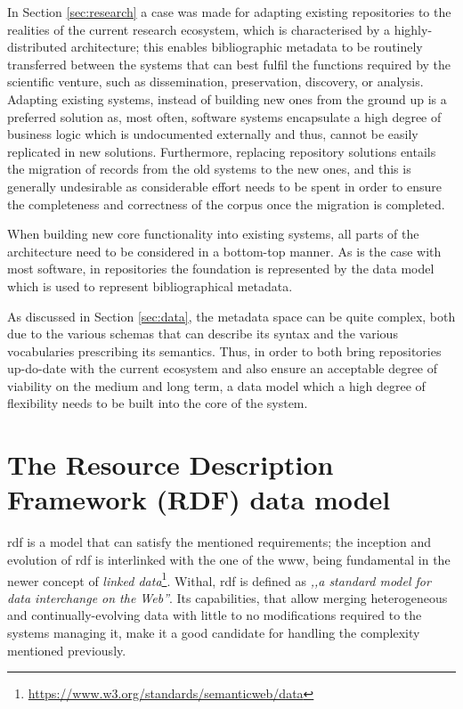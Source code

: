 In Section \ref{sec:research} a case was made for adapting existing repositories to the realities of the current research ecosystem, which is characterised by a highly-distributed architecture; this enables bibliographic metadata to be routinely transferred between the systems that can best fulfil the functions required by the scientific venture, such as dissemination, preservation, discovery, or analysis. Adapting existing systems, instead of building new ones from the ground up is a preferred solution as, most often, software systems encapsulate a high degree of business logic which is undocumented externally and thus, cannot be easily replicated in new solutions. Furthermore, replacing repository solutions entails the migration of records from the old systems to the new ones, and this is generally undesirable as considerable effort needs to be spent in order to ensure the completeness and correctness of the corpus once the migration is completed.

When building new core functionality into existing systems, all parts of the architecture need to be considered in a bottom-top manner. As is the case with most software, in repositories the foundation is represented by the data model which is used to represent bibliographical metadata.

As discussed in Section \ref{sec:data}, the metadata space can be quite complex, both due to the various schemas that can describe its syntax and the various vocabularies prescribing its semantics. Thus, in order to both bring repositories up-do-date with the current ecosystem and also ensure an acceptable degree of viability on the medium and long term, a data model which a high degree of flexibility needs to be built into the core of the system.

\section{The Resource Description Framework (RDF) data model}
\label{sec:rdf}

\gls{rdf} is a model that can satisfy the mentioned requirements; the inception and evolution of \gls{rdf} is interlinked with the one of the \gls{www}, being fundamental in the newer concept of \emph{linked data}\footnote{\url{https://www.w3.org/standards/semanticweb/data}}. Withal, \gls{rdf} is defined as \emph{,,a standard model for data interchange on the Web''}\cite{rdf}. Its capabilities, that allow merging heterogeneous and continually-evolving data with little to no modifications required to the systems managing it, make it a good candidate for handling the complexity mentioned previously. 

